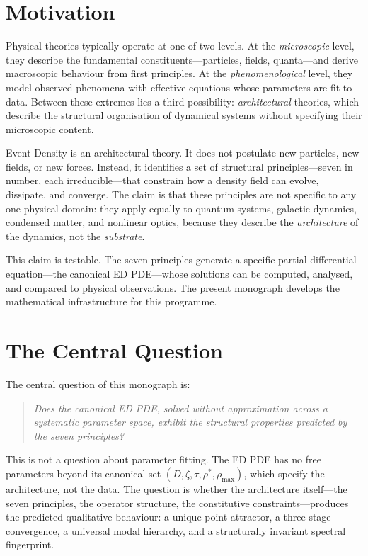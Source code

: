 \documentclass[11pt,twoside,openright]{book}
\theoremstyle{definition}
\theoremstyle{plain}
\theoremstyle{definition}
\theoremstyle{remark}
\newcommand{\rhomax}{\rho_{\max}}
\newcommand{\rhostar}{\rho^{*}}
\begin{document}
\section{Motivation}\label{sec:motivation}

Physical theories typically operate at one of two levels. At the \emph{microscopic} level, they describe the fundamental constituents---particles, fields, quanta---and derive macroscopic behaviour from first principles. At the \emph{phenomenological} level, they model observed phenomena with effective equations whose parameters are fit to data. Between these extremes lies a third possibility: \emph{architectural} theories, which describe the structural organisation of dynamical systems without specifying their microscopic content.

Event Density is an architectural theory. It does not postulate new particles, new fields, or new forces. Instead, it identifies a set of structural principles---seven in number, each irreducible---that constrain how a density field can evolve, dissipate, and converge. The claim is that these principles are not specific to any one physical domain: they apply equally to quantum systems, galactic dynamics, condensed matter, and nonlinear optics, because they describe the \emph{architecture} of the dynamics, not the \emph{substrate}.

This claim is testable. The seven principles generate a specific partial differential equation---the canonical ED PDE---whose solutions can be computed, analysed, and compared to physical observations. The present monograph develops the mathematical infrastructure for this programme.

\section{The Central Question}\label{sec:central-question}

The central question of this monograph is:

\begin{quote}
\itshape Does the canonical ED PDE, solved without approximation across a systematic parameter space, exhibit the structural properties predicted by the seven principles?
\end{quote}

This is not a question about parameter fitting. The ED PDE has no free parameters beyond its canonical set \((D, \zeta, \tau, \rhostar, \rhomax)\), which specify the architecture, not the data. The question is whether the architecture itself---the seven principles, the operator structure, the constitutive constraints---produces the predicted qualitative behaviour: a unique point attractor, a three-stage convergence, a universal modal hierarchy, and a structurally invariant spectral fingerprint.
\end{document}
